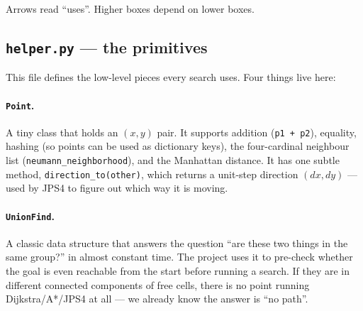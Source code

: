 \documentclass[11pt,a4paper]{article}
\begin{document}
\begin{center}
\end{center}

Arrows read ``uses''. Higher boxes depend on lower boxes.

\subsection{\texttt{helper.py} --- the primitives}

This file defines the low-level pieces every search uses. Four things live here:

\paragraph{\texttt{Point}.}
A tiny class that holds an $(x, y)$ pair. It supports addition (\texttt{p1 + p2}), equality, hashing (so points can be used as dictionary keys), the four-cardinal neighbour list (\texttt{neumann\_neighborhood}), and the Manhattan distance. It has one subtle method, \texttt{direction\_to(other)}, which returns a unit-step direction $(dx, dy)$ --- used by JPS4 to figure out which way it is moving.

\paragraph{\texttt{UnionFind}.}
A classic data structure that answers the question ``are these two things in the same group?'' in almost constant time. The project uses it to pre-check whether the goal is even reachable from the start before running a search. If they are in different connected components of free cells, there is no point running Dijkstra/A*/JPS4 at all --- we already know the answer is ``no path''.
\end{document}
